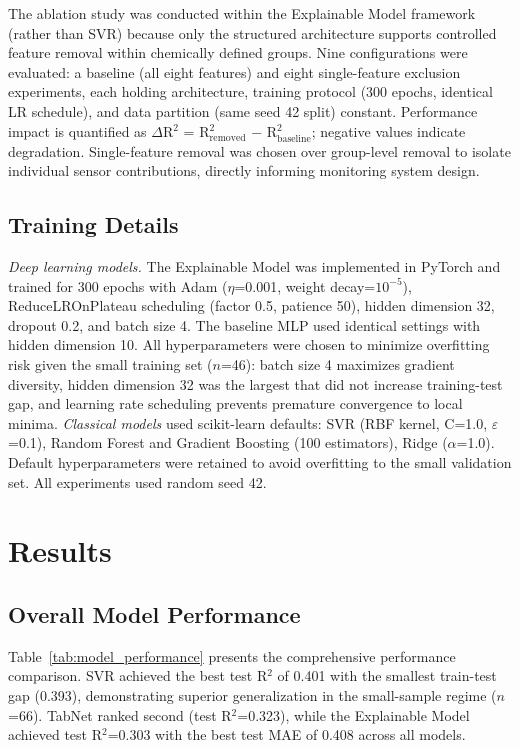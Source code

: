 \documentclass[runningheads]{llncs}
\begin{document}
The ablation study was conducted within the Explainable Model framework (rather than SVR) because only the structured architecture supports controlled feature removal within chemically defined groups. Nine configurations were evaluated: a baseline (all eight features) and eight single-feature exclusion experiments, each holding architecture, training protocol (300 epochs, identical LR schedule), and data partition (same seed 42 split) constant. Performance impact is quantified as $\Delta$R$^2$ = R$^2_{\text{removed}}$ $-$ R$^2_{\text{baseline}}$; negative values indicate degradation. Single-feature removal was chosen over group-level removal to isolate individual sensor contributions, directly informing monitoring system design.

\subsection{Training Details}

\textit{Deep learning models.} The Explainable Model was implemented in PyTorch and trained for 300 epochs with Adam ($\eta$=0.001, weight decay=$10^{-5}$), ReduceLROnPlateau scheduling (factor 0.5, patience 50), hidden dimension 32, dropout 0.2, and batch size 4. The baseline MLP used identical settings with hidden dimension 10. All hyperparameters were chosen to minimize overfitting risk given the small training set ($n$=46): batch size 4 maximizes gradient diversity, hidden dimension 32 was the largest that did not increase training-test gap, and learning rate scheduling prevents premature convergence to local minima. \textit{Classical models} used scikit-learn defaults: SVR (RBF kernel, C=1.0, $\varepsilon$=0.1), Random Forest and Gradient Boosting (100 estimators), Ridge ($\alpha$=1.0). Default hyperparameters were retained to avoid overfitting to the small validation set. All experiments used random seed 42.


\section{Results}

\subsection{Overall Model Performance}

Table~\ref{tab:model_performance} presents the comprehensive performance comparison. SVR achieved the best test R$^2$ of 0.401 with the smallest train-test gap (0.393), demonstrating superior generalization in the small-sample regime ($n$=66). TabNet ranked second (test R$^2$=0.323), while the Explainable Model achieved test R$^2$=0.303 with the best test MAE of 0.408 across all models.
\end{document}

